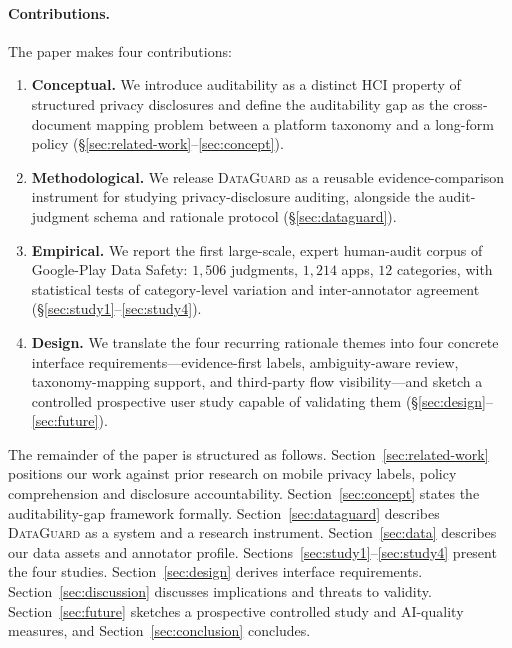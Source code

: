 \documentclass[11pt,a4paper]{article}
\newcommand{\dataguard}{\textsc{DataGuard}}
\begin{document}
\paragraph{Contributions.}
The paper makes four contributions:
\begin{enumerate}[leftmargin=*,nosep,topsep=2pt]
  \item \textbf{Conceptual.} We introduce auditability as a distinct HCI
        property of structured privacy disclosures and define the
        auditability gap as the cross-document mapping problem between a
        platform taxonomy and a long-form policy
        (\S\ref{sec:related-work}--\ref{sec:concept}).
  \item \textbf{Methodological.} We release \dataguard{} as a reusable
        evidence-comparison instrument for studying privacy-disclosure
        auditing, alongside the audit-judgment schema and rationale
        protocol (\S\ref{sec:dataguard}).
  \item \textbf{Empirical.} We report the first large-scale, expert
        human-audit corpus of Google-Play Data Safety: $1{,}506$ judgments,
        $1{,}214$ apps, $12$ categories, with statistical tests of
        category-level variation and inter-annotator agreement
        (\S\ref{sec:study1}--\ref{sec:study4}).
  \item \textbf{Design.} We translate the four recurring rationale themes
        into four concrete interface requirements---evidence-first labels,
        ambiguity-aware review, taxonomy-mapping support, and third-party
        flow visibility---and sketch a controlled prospective user study
        capable of validating them (\S\ref{sec:design}--\ref{sec:future}).
\end{enumerate}

The remainder of the paper is structured as follows.
Section~\ref{sec:related-work} positions our work against prior research on
mobile privacy labels, policy comprehension and disclosure accountability.
Section~\ref{sec:concept} states the auditability-gap framework formally.
Section~\ref{sec:dataguard} describes \dataguard{} as a system and a
research instrument. Section~\ref{sec:data} describes our data assets and
annotator profile. Sections~\ref{sec:study1}--\ref{sec:study4} present the
four studies. Section~\ref{sec:design} derives interface requirements.
Section~\ref{sec:discussion} discusses implications and threats to
validity. Section~\ref{sec:future} sketches a prospective controlled study
and AI-quality measures, and Section~\ref{sec:conclusion} concludes.
\end{document}
